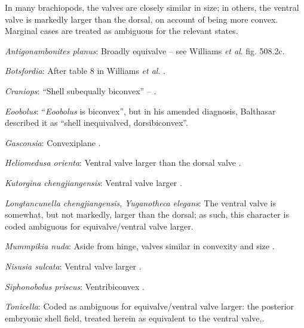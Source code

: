 \documentclass[openany]{book}
\theoremstyle{definition}
\theoremstyle{definition}
\theoremstyle{definition}
\theoremstyle{remark}
\begin{document}
In many brachiopods, the valves are closely similar in size; in others,
the ventral valve is markedly larger than the dorsal, on account of
being more convex. Marginal cases are treated as ambiguous for the
relevant states.

\hypertarget{Antigonambonites_planus-coding-99}{}
\emph{Antigonambonites planus}: Broadly equivalve -- see Williams
\emph{et al}. \citeyearpar{Williams2000LinguliformeaCraniiformea} fig.
508.2c.

\hypertarget{Botsfordia-coding-99}{}
\emph{Botsfordia}: After table 8 in Williams \emph{et al}.
\citeyearpar{Williams2000LinguliformeaCraniiformea}.

\hypertarget{Craniops-coding-99}{}
\emph{Craniops}: ``Shell subequally biconvex'' --
\citet{Williams2000LinguliformeaCraniiformea}.

\hypertarget{Eoobolus-coding-99}{}
\emph{Eoobolus}: ``\emph{Eoobolus} is biconvex'', but in his amended
diagnosis, Balthasar \citeyearpar{Balthasar2009Thebrachiopod} described
it as ``shell inequivalved, dorsibiconvex''.

\hypertarget{Gasconsia-coding-99}{}
\emph{Gasconsia}: Convexiplane
\citep[p.~187]{Williams2000LinguliformeaCraniiformea}.

\hypertarget{Heliomedusa_orienta-coding-99}{}
\emph{Heliomedusa orienta}: Ventral valve larger than the dorsal valve
\citep[p.~659]{Zhang2009Architectureand}.

\hypertarget{Kutorgina_chengjiangensis-coding-99}{}
\emph{Kutorgina chengjiangensis}: Ventral valve larger \citep[see][fig.
125.]{Williams2000LinguliformeaCraniiformea}.

\hypertarget{Longtancunella_chengjiangensis-coding-99}{}
\emph{Longtancunella chengjiangensis}, \emph{Yuganotheca elegans}: The
ventral valve is somewhat, but not markedly, larger than the dorsal; as
such, this character is coded ambiguous for equivalve/ventral valve
larger.

\hypertarget{Mummpikia_nuda-coding-99}{}
\emph{Mummpikia nuda}: Aside from hinge, valves similar in convexity and
size \citep{Balthasar2008iMummpikia}.

\hypertarget{Nisusia_sulcata-coding-99}{}
\emph{Nisusia sulcata}: Ventral valve larger \citep[see][fig.
126.]{Williams2000LinguliformeaCraniiformea}.

\hypertarget{Siphonobolus_priscus-coding-99}{}
\emph{Siphonobolus priscus}: Ventribiconvex
\citep{Popov2009Earlyontogeny}.

\hypertarget{Tonicella-coding-99}{}
\emph{Tonicella}: Coded as ambiguous for equivalve/ventral valve larger:
the posterior embryonic shell field, treated herein as equivalent to the
ventral valve,.
\end{document}
